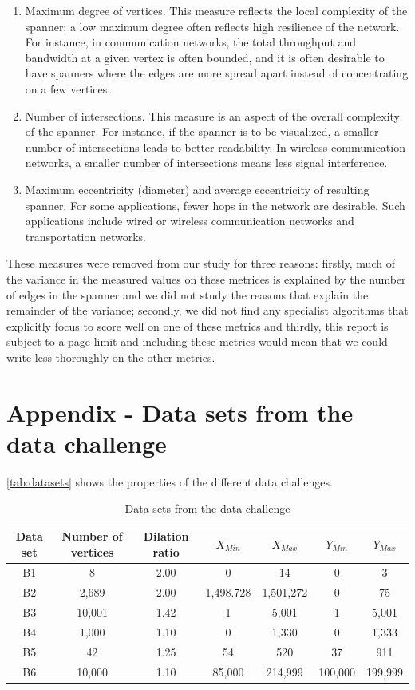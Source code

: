 \documentclass[a4paper,twoside,11pt,hidelinks]{article}
\theoremstyle{plain}
\theoremstyle{definition}  %
\begin{document}
\begin{enumerate}
	\item Maximum degree of vertices. This measure reflects the local complexity of the spanner; a low maximum degree often reflects high resilience of the network. For instance, in communication networks, the total throughput and bandwidth at a given vertex is often bounded, and it is often desirable to have spanners where the edges are more spread apart instead of concentrating on a few vertices.

    \item Number of intersections. This measure is an aspect of the overall complexity of the spanner. For instance, if the spanner is to be visualized, a smaller number of intersections leads to better readability. In wireless communication networks, a smaller number of intersections means less signal interference.

	\item Maximum eccentricity (diameter) and average eccentricity of resulting spanner. For some applications, fewer hops in the network are desirable. Such applications include wired or wireless communication networks and transportation networks.
\end{enumerate}

These measures were removed from our study for three reasons: firstly, much of the variance in the measured values on these metrices is explained by the number of edges in the spanner and we did not study the reasons that explain the remainder of the variance; secondly, we did not find any specialist algorithms that explicitly focus to score well on one of these metrics and thirdly, this report is subject to a page limit and including these metrics would mean that we could write less thoroughly on the other metrics.

\section{Appendix - Data sets from the data challenge}
\label{app:datasets}

\autoref{tab:datasets} shows the properties of the different data challenges.

\begin{table}[h!]
\centering
\begin{tabular}{c |c| c | c | c | c | c}
	Data set & Number of vertices & Dilation ratio & $X_{Min}$ & $X_{Max}$ & $Y_{Min}$ & $Y_{Max}$ \\ \hline
	B1 & 8 & 2.00 & 0 & 14 & 0 & 3\\
    B2 & 2,689 & 2.00 & 1,498.728 & 1,501,272 & 0 & 75\\
    B3 & 10,001 & 1.42 & 1 & 5,001 & 1 & 5,001\\
    B4 & 1,000 & 1.10 & 0 & 1,330 & 0 & 1,333\\
    B5 & 42 & 1.25 & 54 & 520 & 37 & 911\\
    B6 & 10,000 & 1.10 & 85,000 & 214,999 & 100,000 & 199,999\\
\end{tabular}
\caption{Data sets from the data challenge}
\label{tab:datasets}
\end{table}
\newpage
\end{document}
